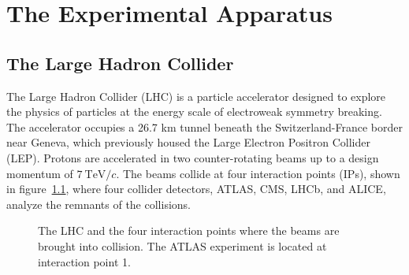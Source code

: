 \chapter{The Experimental Apparatus}
\section{The Large Hadron Collider}
The Large Hadron Collider (LHC) is a particle accelerator designed to explore the physics of particles at the energy scale of electroweak symmetry breaking. The accelerator occupies a 26.7 km tunnel beneath the Switzerland-France border near Geneva, which previously housed the Large Electron Positron Collider (LEP). Protons are accelerated in two counter-rotating beams up to a design momentum of $7~\mbox{TeV}/c$. The beams collide at four interaction points (IPs), shown in figure~\ref{fig:LHC-IPs}, where four collider detectors, ATLAS, CMS, LHCb, and ALICE, analyze the remnants of the collisions.

\begin{figure}[htbp]
	\centering
	\caption{The LHC and the four interaction points where the beams are brought into collision. The ATLAS experiment is located at interaction point 1.}
	\label{fig:LHC-IPs}
\end{figure}


